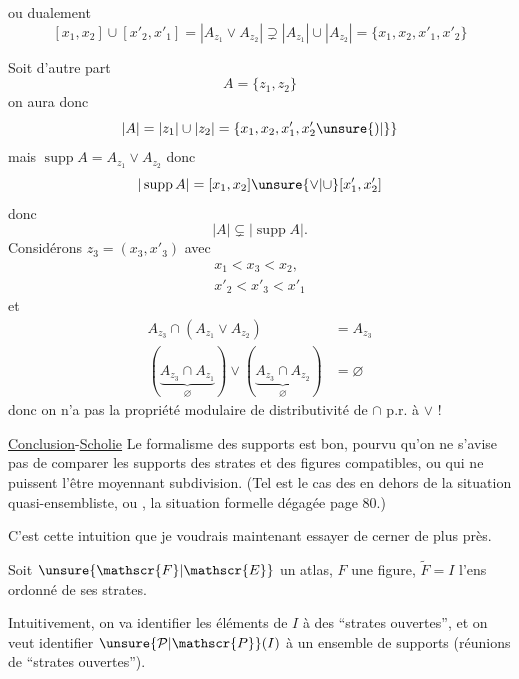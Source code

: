 ou dualement
\[
[x_1,x_2]\cup[x'_2,x'_1]=|A_{z_1}\vee A_{z_2}|\supsetneq|A_{z_1}|\cup|A_{z_2}|=\{x_1,x_2,x'_1,x'_2\}
\]

Soit d'autre part
\[
A=\{z_1,z_2\}
\]
on aura donc
\[
|A|=|z_1|\cup|z_2|=\{x_1,x_2,x'_1,x'_2\unsure{)|\}}
\]
mais $\operatorname{supp}A=A_{z_1}\vee A_{z_2}$ donc
\[
|\operatorname{supp}A|=[x_1,x_2]\unsure{\vee|\cup}[x'_1,x'_2]
\]
 donc
\[
|A|\subsetneq|\operatorname{supp}A|.
\]
Considérons  $z_3=(x_3,x'_3)$ avec
\[
\begin{aligned}
x_1<x_3<x_2,\\
x'_2<x'_3<x'_1
\end{aligned}
\]
et
\[
\begin{aligned}
A_{z_3}\cap(A_{z_1}\vee A_{z_2})&=A_{z_3}\\
(\underbrace{A_{z_3}\cap A_{z_1}}_{\varnothing})\vee(\underbrace{A_{z_3}\cap A_{z_2}}_{\varnothing})&=\varnothing
\end{aligned}
\]
donc on n'a pas la propriété modulaire de distributivité de $\cap$ p.r. à $\vee$ !

\uline{Conclusion}-\uline{Scholie} Le formalisme des supports est bon,  pourvu qu'on ne s'avise pas de comparer les supports des strates et des figures   compatibles, ou qui ne puissent l'être moyennant subdivision. (Tel est le cas des  en dehors de la situation quasi-ensembliste, ou , la situation formelle dégagée page $80$.)

C'est cette intuition que je voudrais maintenant essayer de cerner de plus près.


Soit $\unsure{\mathscr{F}|\mathscr{E}}$ un atlas, $F$ une figure, $\widetilde F=I$ l'ens ordonné de ses strates.


Intuitivement, on va identifier les éléments de $I$ à des ``strates ouvertes'', et on veut identifier $\unsure{\mathcal{P}|\mathscr{P}}(I)$ à  un ensemble de supports (réunions de ``strates ouvertes'').

